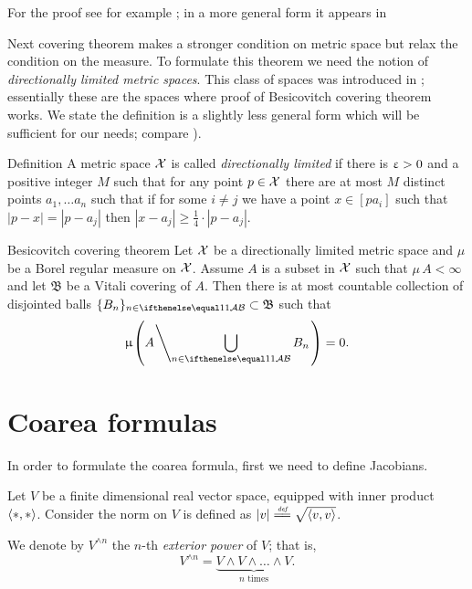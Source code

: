 For the proof see for example \cite[Theorem 1.6]{heinonen};
in a more general form it appears in \cite[Section 2.8]{federer}

Next covering theorem makes a stronger condition on metric space
but relax the condition on the measure.
To formulate this theorem we need 
the notion of \emph{directionally limited metric spaces}.
This class of spaces was introduced in \cite[2.8.9]{federer};
essentially these are the spaces where proof of Besicovitch covering theorem
works.
We state the definition is a slightly less general form which will be sufficient for our needs;
compare \cite[page 7]{heinonen}).

\begin{thm}{Definition}\label{def:directionally-limited}
A metric space $\mathcal{X}$
is called \emph{directionally limited}
if there is $\upvarepsilon>0$ and a positive integer $M$
such that for any point $p\in \spc{X}$
there are at most $M$ distinct points $a_1,\dots a_n$
such that if for some $i\ne j$ we have a point $x\in [pa_i]$ such that $|p-x|=|p-a_j|$
then $|x-a_j|\ge\tfrac14\cdot|p-a_j|$.
\end{thm}
 



\begin{thm}{Besicovitch covering theorem}
Let $\mathcal{X}$ be a directionally limited metric space 
and $\mu$ be a Borel regular measure on $\mathcal{X}$.
Assume $A$ is a subset in $\mathcal{X}$ such that $\mu\, A<\infty$
and let $\mathfrak{B}$ be a Vitali covering of $A$.
Then there is at most countable collection of disjointed balls 
$\{B_n\}_{n\in\IndexSet}\subset\mathfrak{B}$ such that
$$\mu\l(A\l\backslash\bigcup_{n\in\IndexSet}B_n\r.\r)=0.$$

\end{thm}

\section{Coarea formulas}\label{sec:coarea-prelim}

In order to formulate the coarea formula,
first we need to define Jacobians.


Let $V$ be a finite dimensional real vector space, equipped with inner product $\langle{*},{*}\rangle$.
Consider the norm on $V$ is defined as $|v|\df\sqrt{\<v,v\>}$.

We denote by $V^{\wedge n}$ the $n$-th \emph{exterior power} of $V$;
that is,
\[V^{\wedge n}=\underbrace{V\wedge V\wedge\dots\wedge V}_{\mbox{$n$ times}}.\]

